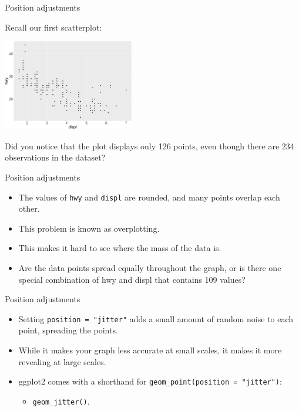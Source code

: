 \documentclass[ignorenonframetext,]{beamer}
\providecommand{\tightlist}{%
  \setlength{\itemsep}{0pt}\setlength{\parskip}{0pt}}
\begin{document}
\begin{frame}{Position adjustments}
\protect\hypertarget{position-adjustments-4}{}

Recall our first scatterplot:

\begin{center}\includegraphics[height=150px]{data-visualization_files/figure-beamer/unnamed-chunk-129-1} \end{center}

Did you notice that the plot displays only 126 points, even though there
are 234 observations in the dataset?

\end{frame}

\begin{frame}[fragile]{Position adjustments}
\protect\hypertarget{position-adjustments-5}{}

\begin{itemize}
\item
  The values of \texttt{hwy} and \texttt{displ} are rounded, and many
  points overlap each other.
\item
  This problem is known as overplotting.
\item
  This makes it hard to see where the mass of the data is.
\item
  Are the data points spread equally throughout the graph, or is there
  one special combination of hwy and displ that contains 109 values?
\end{itemize}

\end{frame}

\begin{frame}[fragile]{Position adjustments}
\protect\hypertarget{position-adjustments-6}{}

\begin{itemize}
\item
  Setting \texttt{position\ =\ "jitter"} adds a small amount of random
  noise to each point, spreading the points.
\item
  While it makes your graph less accurate at small scales, it makes it
  more revealing at large scales.
\item
  ggplot2 comes with a shorthand for
  \texttt{geom\_point(position\ =\ "jitter")}:

  \begin{itemize}
  \tightlist
  \item
    \texttt{geom\_jitter()}.
  \end{itemize}
\end{itemize}

\end{frame}
\end{document}
